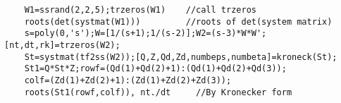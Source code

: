 \begin{examples}
  \begin{Verbatim}
    W1=ssrand(2,2,5);trzeros(W1)    //call trzeros
    roots(det(systmat(W1)))         //roots of det(system matrix)
    s=poly(0,'s');W=[1/(s+1);1/(s-2)];W2=(s-3)*W*W';[nt,dt,rk]=trzeros(W2);
    St=systmat(tf2ss(W2));[Q,Z,Qd,Zd,numbeps,numbeta]=kroneck(St);
    St1=Q*St*Z;rowf=(Qd(1)+Qd(2)+1):(Qd(1)+Qd(2)+Qd(3));
    colf=(Zd(1)+Zd(2)+1):(Zd(1)+Zd(2)+Zd(3));
    roots(St1(rowf,colf)), nt./dt     //By Kronecker form
  \end{Verbatim}
\end{examples}
\begin{manseealso}
     
\end{manseealso}

